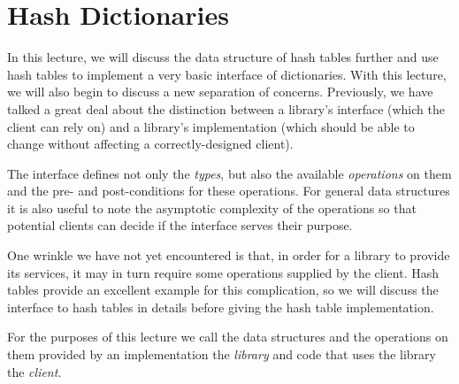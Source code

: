 \chapter{Hash Dictionaries}
\label{ch:hdict}

\newcommand{\lecnum}{13}
\newcommand{\lecturer}{Frank Pfenning, Rob Simmons, Iliano Cervesato}

\maketitle

\begin{preamble}
\noindent
In this lecture, we will discuss the data structure of hash tables
further and use hash tables to implement a very basic interface of
dictionaries.  With this lecture, we will also begin to discuss a new
separation of concerns. Previously, we have talked a great deal about
the distinction between a library's interface (which the client can
rely on) and a library's implementation (which should be able to
change without affecting a correctly-designed client).

The interface defines not only the \emph{types}, but also the
available \emph{operations} on them and the pre- and post-conditions
for these operations.  For general data structures it is also useful
to note the asymptotic complexity of the operations so that potential
clients can decide if the interface serves their purpose.

One wrinkle we have not yet encountered is that, in order for a
library to provide its services, it may in turn require some
operations supplied by the client.  Hash tables provide an excellent
example for this complication, so we will discuss the interface to
hash tables in details before giving the hash table implementation.



For the purposes of this lecture we call the data structures and the
operations on them provided by an implementation the \emph{library}
and code that uses the library the \emph{client}.
\end{preamble}


